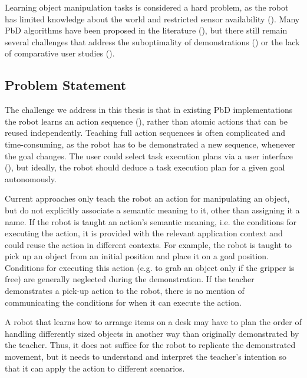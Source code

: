 Learning object manipulation tasks is considered a hard problem, as the robot has limited knowledge about the world and restricted sensor availability (\cite{ekvall2008robot}).
Many PbD algorithms have been proposed in the literature (\cite{argall2009survey,billing2010formalism}), but there still remain several challenges that address the suboptimality of demonstrations (\cite{chen2003programing,kaiser1995obtaining}) or the lack of comparative user studies (\cite{suay2012practical}).

\subsection{Problem Statement}
The challenge we address in this thesis is that in existing PbD implementations the robot learns an action sequence (\cite{orendt2016robot,peppoloni2014ros}), rather than atomic actions that can be reused independently. 
Teaching full action sequences is often complicated and time-consuming, as the robot has to be demonstrated a new sequence, whenever the goal changes.
The user could select task execution plans via a user interface (\cite{guerin2015framework}), but ideally, the robot should deduce a task execution plan for a given goal autonomously.

Current approaches only teach the robot an action for manipulating an object, but do not explicitly associate a semantic meaning to it, other than assigning it a name.
If the robot is taught an action's semantic meaning, i.e. the conditions for executing the action, it is provided with the relevant application context and could reuse the action in different contexts.
For example, the robot is taught to pick up an object from an initial position and place it on a goal position.
Conditions for executing this action (e.g. to grab an object only if the gripper is free) are generally neglected during the demonstration.
If the teacher demonstrates a pick-up action to the robot, there is no mention of communicating the conditions for when it can execute the action.

A robot that learns how to arrange items on a desk may have to plan the order of handling differently sized objects in another way than originally demonstrated by the teacher.
Thus, it does not suffice for the robot to replicate the demonstrated movement, but it needs to understand and interpret the teacher's intention so that it can apply the action to different scenarios.

